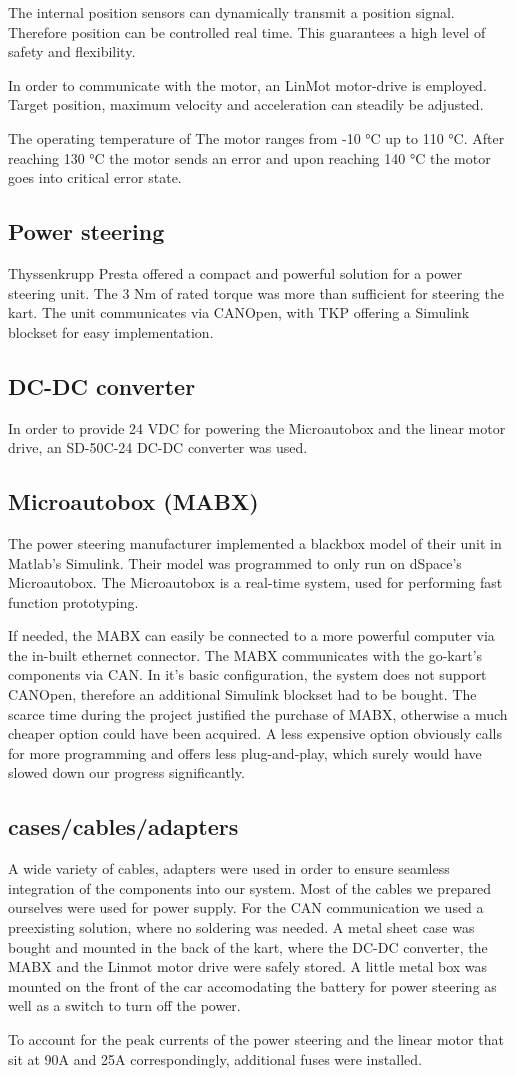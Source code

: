 The internal position sensors can dynamically transmit a position signal. Therefore position can be controlled real time. This guarantees a high level of safety and flexibility. 

In order to communicate with the motor, an LinMot motor-drive is employed. Target position, maximum velocity and acceleration can steadily be adjusted.

The operating temperature of The motor ranges from -10 °C up to 110 °C. After reaching 130 °C the motor sends an error and upon reaching 140 °C the motor goes into critical error state.


\subsection{Power steering}
Thyssenkrupp Presta offered a compact and powerful solution for a power steering unit. The 3 Nm of rated torque was more than sufficient for steering the kart. The unit communicates via CANOpen, with TKP offering a Simulink blockset for easy implementation. 


\subsection{DC-DC converter}
In order to provide 24 VDC for powering the Microautobox and the linear motor drive, an SD-50C-24 DC-DC converter was used.

\subsection{Microautobox (MABX)}
The power steering manufacturer implemented a blackbox model of their unit in Matlab's Simulink. Their model was programmed to only run on dSpace's Microautobox. The Microautobox is a real-time system, used for performing fast function prototyping.

If needed, the MABX can easily be connected to a more powerful computer via the in-built ethernet connector. The MABX communicates with the go-kart's components via CAN. In it's basic configuration, the system does not support CANOpen, therefore an additional Simulink blockset had to be bought. The scarce time during the project justified the purchase of MABX, otherwise a much cheaper option could have been acquired. A less expensive option obviously calls for more programming and offers less plug-and-play, which surely would have slowed down our progress significantly. 

\subsection{cases/cables/adapters}
A wide variety of cables, adapters were used in order to ensure seamless integration of the components into our system.
Most of the cables we prepared ourselves were used for power supply.
For the CAN communication we used a preexisting solution, where no soldering was needed.
A metal sheet case was bought and mounted in the back of the kart, where the DC-DC converter, the MABX and the Linmot motor drive were safely stored.
A little metal box was mounted on the front of the car accomodating the battery for power steering as well as a switch to turn off the power.

To account for the peak currents of the power steering and the linear motor that sit at 90A and 25A correspondingly, additional fuses were installed.